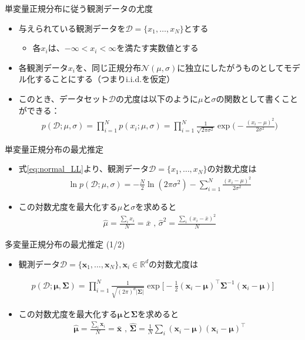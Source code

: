 \documentclass[aspectratio=169,unicode,dvipdfmx,14pt]{beamer}
\begin{document}
\begin{frame}{単変量正規分布に従う観測データの尤度}
\begin{itemize}
\item 与えられている観測データを$\mathcal{D}=\{x_1,\ldots,x_N\}$とする
\begin{itemize}
\item 各$x_i$は、$-\infty < x_i < \infty$を満たす実数値とする
\end{itemize}
\item 各観測データ$x_i$を、同じ正規分布$\mathcal{N}(\mu,\sigma)$に独立にしたがうものとしてモデル化することにする（つまりi.i.d.を仮定）
\item このとき、データセット$\mathcal{D}$の尤度は以下のように$\mu$と$\sigma$の関数として書くことができる：
\begin{align}
p(\mathcal{D};\mu,\sigma)=\prod_{i=1}^N p(x_i;\mu,\sigma)
=\prod_{i=1}^N \frac{1}{\sqrt{2\pi\sigma^2}}\exp\bigg( - \frac{(x_i - \mu)^2}{2\sigma^2}\bigg)
\label{eq:normal_LL}
\end{align}
\end{itemize}
\end{frame}


\begin{frame}{単変量正規分布の最尤推定}
\begin{itemize}
\item 式\eqref{eq:normal_LL}より、観測データ$\mathcal{D}=\{ x_1, \ldots, x_N \}$の対数尤度は
\begin{align}
\ln p(\mathcal{D};\mu,\sigma)
= - \frac{N}{2}\ln(2\pi\sigma^2) - \sum_{i=1}^N \frac{(x_i - \mu)^2}{2\sigma^2}
\end{align}
\item この対数尤度を最大化する$\mu$と$\sigma$を求めると
\begin{align}
\hat{\mu} = \frac{\sum_i x_i}{N} = \bar{x} \mbox{ , \ }
\hat{\sigma}^2 = \frac{\sum_i (x_i - \bar{x})^2}{N}
\end{align}
\end{itemize}
\end{frame}

\begin{frame}{多変量正規分布の最尤推定 (1/2)}
\begin{itemize}
\item 観測データ$\mathcal{D}=\{ \bm{x}_1, \ldots, \bm{x}_N \}, \bm{x}_i \in \mathbb{R}^d$の対数尤度は
\end{itemize}
\begin{align}
p(\mathcal{D};\bm{\mu},\bm{\Sigma})
=
\prod_{i=1}^N \frac{1}{\sqrt{(2\pi)^d|\bm{\Sigma}|}}
\exp\bigg[ - \frac{1}{2} (\bm{x}_i - \bm{\mu})^\intercal \bm{\Sigma}^{-1} (\bm{x}_i - \bm{\mu}) \bigg]
\end{align}
\begin{itemize}
\item この対数尤度を最大化する$\bm{\mu}$と$\bm{\Sigma}$を求めると
\begin{align}
\hat{\bm{\mu}} = \frac{\sum_i \bm{x}_i}{N} = \bar{\bm{x}} \mbox{ , \ }
\hat{\bm{\Sigma}} = \frac{1}{N}\sum_i (\bm{x}_i - \bm{\mu}) (\bm{x}_i - \bm{\mu})^\intercal
\end{align}
\end{itemize}
\end{frame}
\end{document}
